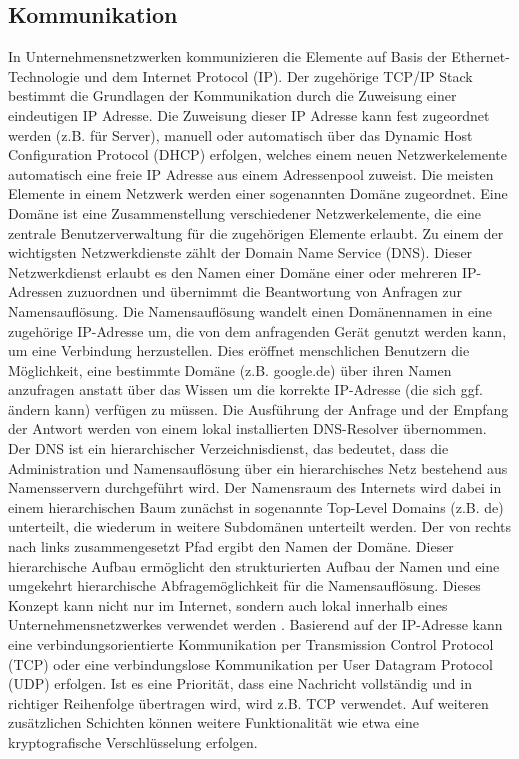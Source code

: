 \subsection{Kommunikation}
In Unternehmensnetzwerken kommunizieren die Elemente auf Basis der Ethernet-Technologie und dem Internet Protocol (IP). Der zugehörige TCP/IP Stack bestimmt die Grundlagen der Kommunikation durch die Zuweisung einer eindeutigen IP Adresse. Die Zuweisung dieser IP Adresse kann fest zugeordnet werden (z.B. für Server), manuell oder automatisch über das Dynamic Host Configuration Protocol (DHCP) erfolgen, welches einem neuen Netzwerkelemente automatisch eine freie IP Adresse aus einem Adressenpool zuweist. Die meisten Elemente in einem Netzwerk werden einer sogenannten Domäne zugeordnet. Eine Domäne ist eine Zusammenstellung verschiedener Netzwerkelemente, die eine zentrale Benutzerverwaltung für die zugehörigen Elemente erlaubt. 
Zu einem der wichtigsten Netzwerkdienste zählt der \glqq Domain Name Service\grqq{} (DNS). Dieser Netzwerkdienst erlaubt es den Namen einer Domäne einer oder mehreren IP-Adressen zuzuordnen und übernimmt die Beantwortung von Anfragen zur Namensauflösung. Die Namensauflösung wandelt einen Domänennamen in eine zugehörige IP-Adresse um, die von dem anfragenden Gerät genutzt werden kann, um eine Verbindung herzustellen. Dies eröffnet menschlichen Benutzern die Möglichkeit, eine bestimmte Domäne (z.B. \glqq google.de\grqq ) über ihren Namen anzufragen anstatt über das Wissen um die korrekte IP-Adresse (die sich ggf. ändern kann) verfügen zu müssen. Die Ausführung der Anfrage und der Empfang der Antwort werden von einem lokal installierten \glqq DNS-Resolver\grqq{} übernommen. Der DNS ist ein hierarchischer Verzeichnisdienst, das bedeutet, dass die Administration und Namensauflösung über ein hierarchisches Netz bestehend aus Namensservern durchgeführt wird. Der Namensraum des Internets wird dabei in einem hierarchischen Baum zunächst in sogenannte \glqq Top-Level Domains\grqq{}  (z.B. \glqq de\grqq ) unterteilt, die wiederum in weitere Subdomänen unterteilt werden. Der von rechts nach links zusammengesetzt Pfad ergibt den Namen der Domäne. Dieser hierarchische Aufbau ermöglicht den strukturierten Aufbau der Namen und eine umgekehrt hierarchische Abfragemöglichkeit für die Namensauflösung. Dieses Konzept kann nicht nur im Internet, sondern auch lokal innerhalb eines Unternehmensnetzwerkes verwendet werden \citep{DNS1}.
Basierend auf der IP-Adresse kann eine verbindungsorientierte Kommunikation per Transmission Control Protocol (TCP) oder eine verbindungslose Kommunikation per User Datagram Protocol (UDP) erfolgen.  Ist es eine Priorität, dass eine Nachricht vollständig und in richtiger Reihenfolge übertragen wird, wird z.B. TCP verwendet. Auf weiteren zusätzlichen Schichten können weitere Funktionalität wie etwa eine kryptografische Verschlüsselung erfolgen. 
